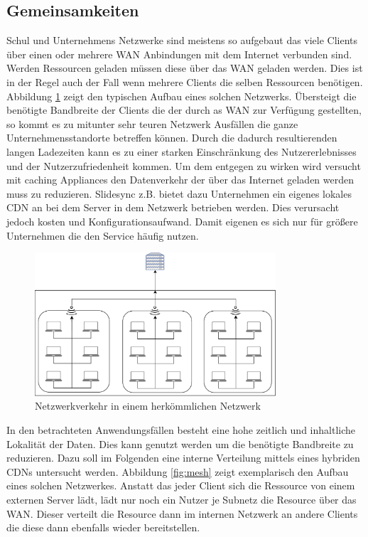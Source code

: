 \subsection{Gemeinsamkeiten}

Schul und Unternehmens Netzwerke sind meistens so aufgebaut das viele Clients über einen oder mehrere WAN Anbindungen mit dem Internet verbunden sind. Werden Ressourcen geladen müssen diese über das WAN geladen werden. Dies ist in der Regel auch der Fall wenn mehrere Clients die selben Ressourcen benötigen. Abbildung \ref{fig:school} zeigt den typischen Aufbau eines solchen Netzwerks. Übersteigt die benötigte Bandbreite der Clients die der durch as WAN zur Verfügung gestellten, so kommt es zu mitunter sehr teuren Netzwerk Ausfällen die ganze Unternehmensstandorte betreffen können. Durch die dadurch resultierenden langen Ladezeiten kann es zu einer starken Einschränkung des Nutzererlebnisses und der Nutzerzufriedenheit kommen.\cite{userWaitingTime} Um dem entgegen zu wirken wird versucht mit caching Appliances den Datenverkehr der über das Internet geladen werden muss zu reduzieren. Slidesync z.B. bietet dazu Unternehmen ein eigenes lokales CDN an bei dem Server in dem Netzwerk betrieben werden. Dies verursacht jedoch kosten und Konfigurationsaufwand. Damit eigenen es sich nur für größere Unternehmen die den Service häufig nutzen.

\begin{figure}[!h]
	\centering
	\includegraphics[width=0.8\textwidth]{figures/network_current}
	\caption[A Figure Short-Title]{Netzwerkverkehr in einem herkömmlichen Netzwerk}
	\label{fig:school}
\end{figure}

In den betrachteten Anwendungsfällen besteht eine hohe zeitlich und inhaltliche Lokalität der Daten. Dies kann genutzt werden um die benötigte Bandbreite zu reduzieren. Dazu soll im Folgenden eine interne Verteilung mittels eines hybriden \pTp CDNs untersucht werden. Abbildung \ref{fig:mesh} zeigt exemplarisch den Aufbau eines solchen Netzwerkes. Anstatt das jeder Client sich die Ressource von einem externen Server lädt, lädt nur noch ein Nutzer je Subnetz die Resource über das WAN. Dieser verteilt die Resource dann im internen Netzwerk an andere Clients die diese dann ebenfalls wieder bereitstellen.

